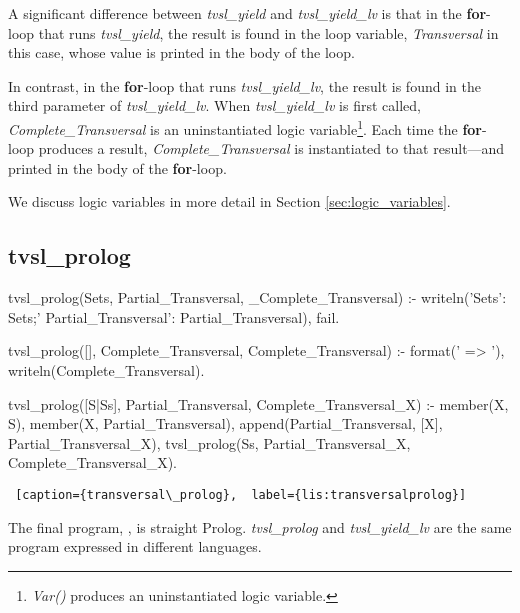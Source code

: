 A significant difference between \textit{tvsl\_yield} and \textit{tvsl\_yield\_lv} is that in the \textbf{for}-loop that runs \textit{tvsl\_yield}, the result is found in the loop variable, \textit{Transversal} in this case, whose value is printed in the body of the loop. 

In contrast, in the \textbf{for}-loop that runs \textit{tvsl\_yield\_lv}, the result is found in the third parameter of \textit{tvsl\_yield\_lv}. When \textit{tvsl\_yield\_lv} is first called, \textit{Complete\_Transversal} is an uninstantiated logic variable\footnote{\textit{Var()} produces an uninstantiated logic variable.}. Each time the \textbf{for}-loop produces a result, \textit{Complete\_Transversal} is instantiated to that result---and printed in the body of the \textbf{for}-loop.

We discuss logic variables in more detail in Section \ref{sec:logic_variables}.

\subsection{tvsl\_prolog}

\begin{minipage}{\linewidth} \largev \hrulefill
\begin{python}[numbers=left]
tvsl_prolog(Sets, Partial_Transversal, _Complete_Transversal) :-
    writeln('Sets': Sets;'  Partial_Transversal': Partial_Transversal), 
    fail.

tvsl_prolog([], Complete_Transversal, Complete_Transversal) :-
    format(' => '),
    writeln(Complete_Transversal).

tvsl_prolog([S|Ss], Partial_Transversal, Complete_Transversal_X) :-
    member(X, S),
    \+ member(X, Partial_Transversal),
    append(Partial_Transversal, [X], Partial_Transversal_X),
    tvsl_prolog(Ss, Partial_Transversal_X, Complete_Transversal_X).

\end{python}
\begin{lstlisting} [caption={transversal\_prolog},  label={lis:transversalprolog}]
\end{lstlisting}
\end{minipage}

The final program, , is straight Prolog. \textit{tvsl\_prolog} and \textit{tvsl\_yield\_lv} are the same program expressed in different languages. 

